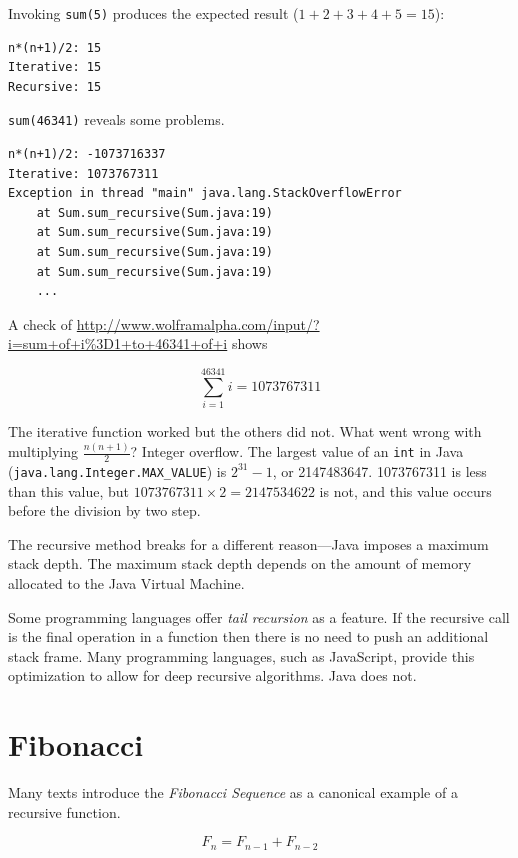 \documentclass{book}
\begin{document}
Invoking \texttt{sum(5)} produces the expected result ($1+2+3+4+5 = 15$):

\begin{lstlisting}
n*(n+1)/2: 15
Iterative: 15
Recursive: 15
\end{lstlisting}

\texttt{sum(46341)} reveals some problems.

\begin{lstlisting}
n*(n+1)/2: -1073716337
Iterative: 1073767311
Exception in thread "main" java.lang.StackOverflowError
	at Sum.sum_recursive(Sum.java:19)
	at Sum.sum_recursive(Sum.java:19)
	at Sum.sum_recursive(Sum.java:19)
	at Sum.sum_recursive(Sum.java:19)
    ...
\end{lstlisting}

A check of \url{http://www.wolframalpha.com/input/?i=sum+of+i\%3D1+to+46341+of+i} shows 

\begin{equation*}
\sum_{i=1}^{46341} i = 1073767311
\end{equation*}

The iterative function worked but the others did not. What went wrong with multiplying $\frac{n(n+1)}{2}$? Integer overflow. The largest value of an \texttt{int} in Java (\texttt{java.lang.Integer.MAX\_VALUE}) is $2^{31} - 1$, or 2147483647. 1073767311 is less than this value, but $1073767311 \times 2 = 2147534622$ is not, and this value occurs before the division by two step.

The recursive method breaks for a different reason---Java imposes a maximum stack depth. The maximum stack depth depends on the amount of memory allocated to the Java Virtual Machine.

Some programming languages offer \textit{tail recursion} as a feature. If the recursive call is the final operation in a function then there is no need to push an additional stack frame. Many programming languages, such as JavaScript, provide this optimization to allow for deep recursive algorithms. Java does not.

\section{Fibonacci}

Many texts introduce the \textit{Fibonacci Sequence} as a canonical example of a recursive function.

\begin{equation*}
F_n = F_{n-1} + F_{n-2}
\end{equation*}
\end{document}
